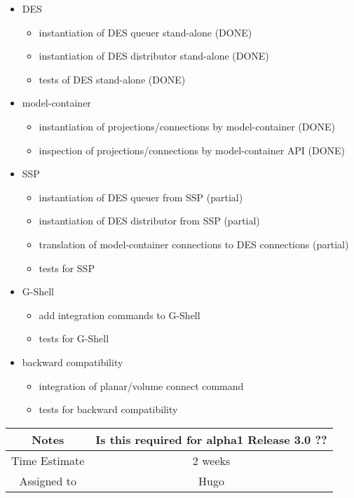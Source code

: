 \documentclass[12pt]{article}
\begin{document}
\begin{itemize}
\item DES
  \begin{itemize}
  \item instantiation of DES queuer stand-alone (DONE)
  \item instantiation of DES distributor stand-alone (DONE)
  \item tests of DES stand-alone (DONE)
  \end{itemize}
\item model-container
  \begin{itemize}
  \item instantiation of projections/connections by model-container (DONE)
  \item inspection of projections/connections by model-container API (DONE)
  \end{itemize}
\item SSP
  \begin{itemize}
  \item instantiation of DES queuer from SSP (partial)
  \item instantiation of DES distributor from SSP (partial)
  \item translation of model-container connections to DES connections (partial)
  \item tests for SSP
  \end{itemize}
\item G-Shell
  \begin{itemize}
  \item add integration commands to G-Shell
  \item tests for G-Shell
  \end{itemize}
\item backward compatibility
  \begin{itemize}
  \item integration of planar/volume connect command
  \item tests for backward compatibility
  \end{itemize}
\end{itemize}


{
  \vspace{5mm}
  \centering
  \begin{tabular}{|c|c|}
    \hline
    Notes
    & Is this required for alpha1 Release 3.0 ?? \\
    \hline
    Time Estimate
    & 2 weeks \\
    \hline
    Assigned to
    & Hugo \\
    \hline
  \end{tabular}
}
\end{document}
